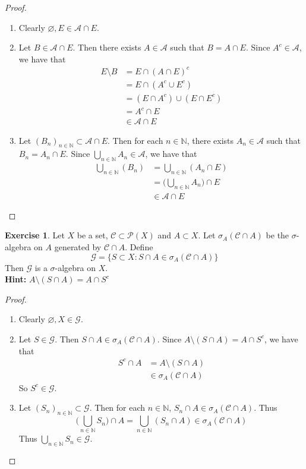 \documentclass{book}
\theoremstyle{definition}
\newtheorem{ex}[definition]{Exercise}
\newcommand{\sig}{\sigma}
\newcommand{\N}{\mathbb{N}}
\newcommand{\MA}{\mathcal{A}}
\newcommand{\MC}{\mathcal{C}}
\newcommand{\MG}{\mathcal{G}}
\newcommand{\MP}{\mathcal{P}}
\newcommand{\lex}[1]{\label{ex:#1}}
\DeclareMathOperator*{\0}{\mbf{0}}
\DeclareMathOperator*{\1}{\mbf{1}}
\begin{document}
	\begin{proof}\
		\begin{enumerate}
			\item Clearly $\varnothing, E \in \MA \cap E$.
			\item Let $B \in \MA \cap E$. Then there exists $A \in \MA$ such that $B = A \cap E$. Since $A^c \in \MA$, we have that 
			\begin{align*}
				E \setminus B 
				&= E \cap (A \cap E)^c \\
				&= E \cap (A^c \cup E^c) \\
				&= (E \cap A^c) \cup (E \cap E^c) \\
				&= A^c \cap E \\
				&\in \MA \cap E
			\end{align*}
			\item Let $(B_n)_{n \in \N} \subset \MA \cap E$. Then for each $n \in \N$, there exists $A_n \in \MA$ such that $B_n = A_n \cap E$. Since $\bigcup\limits_{n \in \N}A_n \in \MA$, we have that 
			\begin{align*}
				\bigcup_{n \in \N}(B_n) 
				&= \bigcup_{n \in \N}(A_n \cap E) \\
				&= \bigg( \bigcup_{n \in \N}A_n \bigg) \cap E \\
				& \in \MA \cap E
			\end{align*}
		\end{enumerate}
	\end{proof}
	
	\begin{ex} \lex{24003} 
		Let $X$ be a set, $\MC \subset \MP(X)$ and $A \subset X$. Let $\sig_A(\MC \cap A)$ be the $\sig$-algebra on $A$ generated by $\MC \cap A$. Define $$\MG = \{S \subset X: S \cap A \in \sig_A(\MC \cap A)\}$$ 
		Then $\MG$ is a $\sig$-algebra on $X$.  \\
		\textbf{Hint:} $A \setminus (S \cap A) = A \cap S^c$
	\end{ex}
	
	\begin{proof}\
		\begin{enumerate}
			\item Clearly $\varnothing, X \in \MG$. 
			\item Let $S \in \MG$. Then $S \cap A \in \sig_A(\MC \cap A)$. Since $A \setminus (S \cap A) = A \cap S^c$, we have that 
			\begin{align*}
				S^c \cap A 
				&= A \setminus (S \cap A)  \\
				& \in \sig_A(\MC \cap A)
			\end{align*}				
			So $S^c \in \MG$. 
			\item Let $(S_n)_{n \in \N} \subset \MG$. Then for each $n \in \N$, $S_n \cap A \in \sig_A(\MC \cap A)$. Thus $$\bigg( \bigcup_{n \in \N} S_n \bigg) \cap A = \bigcup\limits_{n \in \N}(S_n \cap A) \in \sig_A(\MC \cap A)$$ Thus $\bigcup\limits_{n \in \N} S_n \in \MG$.
		\end{enumerate}
	\end{proof}
	
\end{document}
